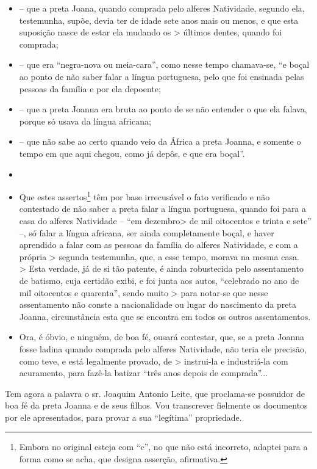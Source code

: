 {\begin{itemize}
\item
  -- que a preta Joana, quando comprada pelo alferes Natividade, segundo
  ela, testemunha, supõe, devia ter de idade sete anos mais ou menos, e
  que esta suposição nasce de estar ela mudando os \textgreater{}
  últimos dentes, quando foi comprada;
\item
  -- que era ``negra-nova ou meia-cara'', como nesse tempo chamava-se, ``e
  boçal ao ponto de não saber falar a língua portuguesa, pelo que foi
  ensinada pelas pessoas da família e por ela depoente;
\item
  -- que a preta Joanna era bruta ao ponto de se não entender o que ela
  falava, porque só usava da língua africana;
\item
  -- que não sabe ao certo quando veio da África a preta Joanna, e
  somente o tempo em que aqui chegou, como já depôs, e que era boçal''.
\item
\item
  Que estes assertos\footnote{ Embora no original esteja com ``c'', no
    que não está incorreto, adaptei para a forma como se acha, que
    designa asserção, afirmativa.} têm por base irrecusável o fato
  verificado e não contestado de não saber a preta falar a língua
  portuguesa, quando foi para a casa do alferes Natividade -- ``em
  dezembro\textgreater{} de mil oitocentos e trinta e sete'' --, só
  falar a língua africana, ser ainda completamente boçal, e haver
  aprendido a falar com as pessoas da família do alferes Natividade, e
  com a própria \textgreater{} segunda testemunha, que, a esse tempo,
  morava na mesma casa.\\
  \textgreater{} Esta verdade, já de si tão patente, é ainda robustecida
  pelo assentamento de batismo, cuja certidão exibi, e foi junta aos
  autos, ``celebrado no ano de mil oitocentos e quarenta'', sendo muito
  \textgreater{} para notar-se que nesse assentamento não conste a
  nacionalidade ou lugar do nascimento da preta Joanna, circunstância
  esta que se encontra em todos os outros assentamentos.
\item
  Ora, é óbvio, e ninguém, de boa fé, ousará contestar, que, se a preta
  Joanna fosse ladina quando comprada pelo alferes Natividade, não teria
  ele precisão, como teve, e está legalmente provado, de \textgreater{}
  instrui-la e industriá-la com acuramento, para fazê-la batizar ``três
  anos depois de comprada''...
\end{itemize}

Tem agora a palavra o sr. Joaquim Antonio Leite, que proclama-se
possuidor de boa fé da preta Joanna e de seus filhos. Vou transcrever
fielmente os documentos por ele apresentados, para provar a sua
``legítima'' propriedade.

}
